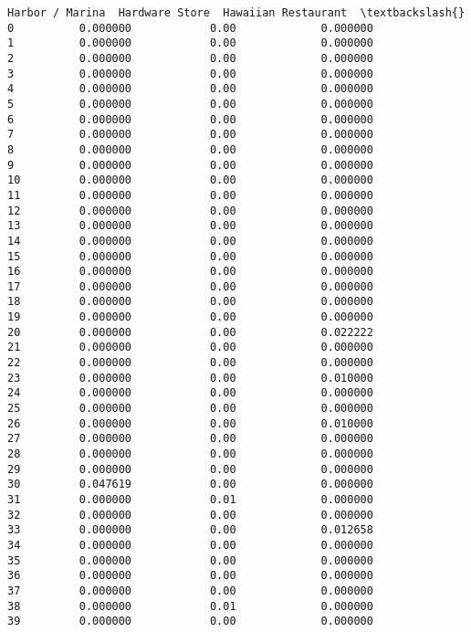 \documentclass[11pt]{article}
\begin{document}
\begin{tcolorbox}[breakable, size=fbox, boxrule=.5pt, pad at break*=1mm, opacityfill=0]
\begin{Verbatim}[commandchars=\\\{\}]
    Harbor / Marina  Hardware Store  Hawaiian Restaurant  \textbackslash{}
0          0.000000            0.00             0.000000
1          0.000000            0.00             0.000000
2          0.000000            0.00             0.000000
3          0.000000            0.00             0.000000
4          0.000000            0.00             0.000000
5          0.000000            0.00             0.000000
6          0.000000            0.00             0.000000
7          0.000000            0.00             0.000000
8          0.000000            0.00             0.000000
9          0.000000            0.00             0.000000
10         0.000000            0.00             0.000000
11         0.000000            0.00             0.000000
12         0.000000            0.00             0.000000
13         0.000000            0.00             0.000000
14         0.000000            0.00             0.000000
15         0.000000            0.00             0.000000
16         0.000000            0.00             0.000000
17         0.000000            0.00             0.000000
18         0.000000            0.00             0.000000
19         0.000000            0.00             0.000000
20         0.000000            0.00             0.022222
21         0.000000            0.00             0.000000
22         0.000000            0.00             0.000000
23         0.000000            0.00             0.010000
24         0.000000            0.00             0.000000
25         0.000000            0.00             0.000000
26         0.000000            0.00             0.010000
27         0.000000            0.00             0.000000
28         0.000000            0.00             0.000000
29         0.000000            0.00             0.000000
30         0.047619            0.00             0.000000
31         0.000000            0.01             0.000000
32         0.000000            0.00             0.000000
33         0.000000            0.00             0.012658
34         0.000000            0.00             0.000000
35         0.000000            0.00             0.000000
36         0.000000            0.00             0.000000
37         0.000000            0.00             0.000000
38         0.000000            0.01             0.000000
39         0.000000            0.00             0.000000


\end{Verbatim}
\end{tcolorbox}
\end{document}
